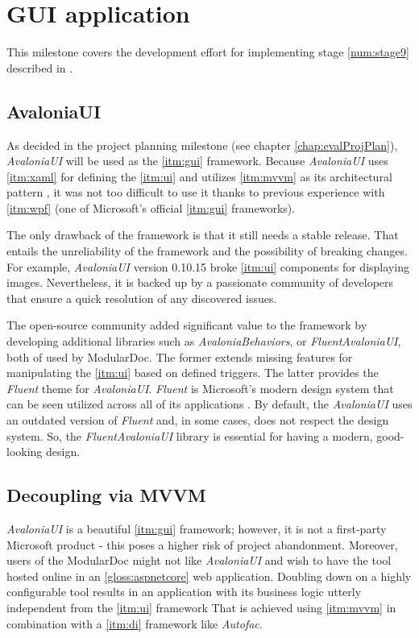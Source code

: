 \chapter{GUI application}

This milestone covers the development effort for implementing stage \ref{num:stage9} described in .

\section{AvaloniaUI}

As decided in the project planning milestone (see chapter \ref{chap:evalProjPlan}), \textit{AvaloniaUI} will be used as the \ref{itm:gui} framework.
Because \textit{AvaloniaUI} uses \ref{itm:xaml} for defining the \ref{itm:ui} and utilizes \ref{itm:mvvm} as its architectural pattern \cite{katz_mvvm_2022}, it was not too difficult to use it thanks to previous experience with \ref{itm:wpf} (one of Microsoft's official \ref{itm:gui} frameworks).

The only drawback of the framework is that it still needs a stable release. That entails the unreliability of the framework and the possibility of breaking changes. For example, \textit{AvaloniaUI} version 0.10.15 broke \ref{itm:ui} components for displaying images. Nevertheless, it is backed up by a passionate community of developers that ensure a quick resolution of any discovered issues.

The open-source community added significant value to the framework by developing additional libraries such as \textit{AvaloniaBehaviors}, or \textit{FluentAvaloniaUI}, both of used by ModularDoc. The former extends missing features for manipulating the \ref{itm:ui} based on defined triggers. The latter provides the \textit{Fluent} theme for \textit{AvaloniaUI}. \textit{Fluent} is Microsoft's modern design system that can be seen utilized across all of its applications \cite{microsoft_microsoft_nodate}. By default, the \textit{AvaloniaUI} uses an outdated version of \textit{Fluent} and, in some cases, does not respect the design system. So, the \textit{FluentAvaloniaUI} library is essential for having a modern, good-looking design.

\section{Decoupling via MVVM}

\textit{AvaloniaUI} is a beautiful \ref{itm:gui} framework; however, it is not a first-party Microsoft product - this poses a higher risk of project abandonment. Moreover, users of the ModularDoc might not like \textit{AvaloniaUI} and wish to have the tool hosted online in an \ref{gloss:aspnetcore} web application. Doubling down on a highly configurable tool results in an application with its business logic utterly independent from the \ref{itm:ui} framework
That is achieved using \ref{itm:mvvm} in combination with a \ref{itm:di} framework like \textit{Autofac}.

